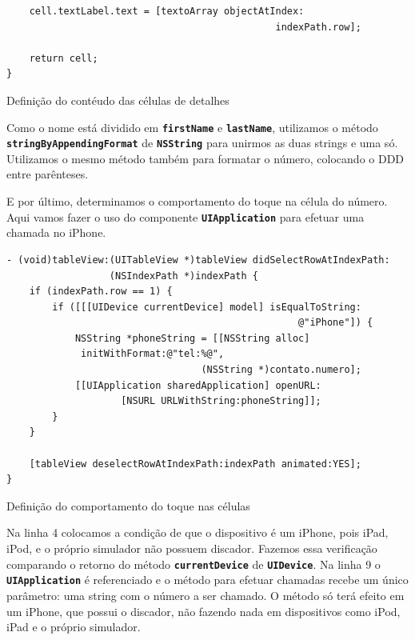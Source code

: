 \documentclass[a4paper,12pt,brazil,doubleside]{book}
\begin{document}
\begin{singlespace}
\begin{listing}[H]
\begin{verbatim}
    cell.textLabel.text = [textoArray objectAtIndex:
                                               indexPath.row];
    
    return cell;
}
\end{verbatim}
\caption{Definição do contéudo das células de detalhes}
\end{listing}


Como o nome está dividido em \texttt{\textbf{firstName}} e \texttt{\textbf{lastName}}, utilizamos o método\\
\texttt{\textbf{stringByAppendingFormat}} de \texttt{\textbf{NSString}} para unirmos as duas strings e uma só. Utilizamos o mesmo método também para formatar o número, colocando o DDD entre parênteses.

E por último, determinamos o comportamento do toque na célula do número. Aqui vamos fazer o uso do componente \texttt{\textbf{UIApplication}} para efetuar uma chamada no iPhone.

\begin{listing}[H]
\begin{verbatim}
- (void)tableView:(UITableView *)tableView didSelectRowAtIndexPath:
                  (NSIndexPath *)indexPath {
    if (indexPath.row == 1) {
        if ([[[UIDevice currentDevice] model] isEqualToString:
                                                   @"iPhone"]) {
            NSString *phoneString = [[NSString alloc] 
             initWithFormat:@"tel:%@",
                                  (NSString *)contato.numero];
            [[UIApplication sharedApplication] openURL:
                    [NSURL URLWithString:phoneString]];
        }
    }
    
    [tableView deselectRowAtIndexPath:indexPath animated:YES];
}
\end{verbatim}
\caption{Definição do comportamento do toque nas células}
\end{listing}


Na linha 4 colocamos a condição de que o dispositivo é um iPhone, pois iPad, iPod, e o próprio simulador não possuem discador. Fazemos essa verificação comparando o retorno do método \texttt{\textbf{currentDevice}} de \texttt{\textbf{UIDevice}}. Na linha 9 o \texttt{\textbf{UIApplication}} é referenciado e o método para efetuar chamadas recebe um único parâmetro: uma string com o número a ser chamado. O método só terá efeito em um iPhone, que possui o discador, não fazendo nada em dispositivos como iPod, iPad e o próprio simulador.


\end{singlespace}
\end{document}
